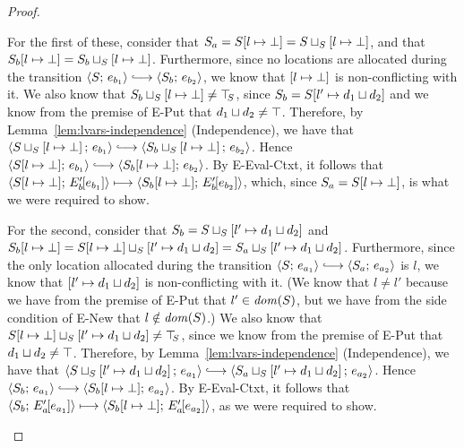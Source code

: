 \begin{proof}
\begin{enumerate}
\begin{enumerate}
      For the first of these, consider that $S_a =
      S[l \mapsto \bot] =
      S \sqcup_{S} \left[ l \mapsto \bot \right]$, and that
      $S_b[l \mapsto \bot] =
      S_b \sqcup_{S} \left[ l \mapsto \bot \right]$.
      Furthermore, since no locations are allocated during the
      transition $\config{S}{e_{b_1}} \parstepsto
      \config{S_b}{e_{b_2}}$, we know that
      $\left[ l \mapsto \bot \right]$ is non-conflicting with it.
      We also know that
      $S_b \sqcup_{S} \left[ l \mapsto \bot \right] \neq \top\hspace{-0.85mm}_{S}$,
      since $S_b = S[l' \mapsto d_1 \sqcup d_2]$ and we know
      from the premise of {\sc E-Put} that $d_1 \sqcup d_2 \neq
      \top$.  Therefore, by Lemma~\ref{lem:lvars-independence}
      (Independence), we have that
      $\config{\lubstore{S}{\store{\storebindingRaw{l}{\bot}}}}{e_{b_1}}
      \parstepsto
      \config{\lubstore{S_b}{\store{\storebindingRaw{l}{\bot}}}}{e_{b_2}}$.
      Hence $\config{\extSRaw{S}{l}{\bot}}{e_{b_1}} \parstepsto
      \config{\extSRaw{S_b}{l}{\bot}}{e_{b_2}}$.  By {\sc
        E-Eval-Ctxt}, it follows that
      $\langle S[l \mapsto \bot];\, E'_b\hspace{-1mm}\left[e_{b_1}\right] \rangle
      \longmapsto
      \langle S_b[l \mapsto \bot];\, E'_b\hspace{-1mm}\left[e_{b_2}\right] \rangle$,
      which, since $S_a = S[l \mapsto \bot]$, is what we were
      required to show.

      For the second, consider that $S_b =
      S \sqcup_{S} \left[ l' \mapsto d_1 \sqcup d_2 \right]$
      and $S_b[l \mapsto \bot] =
      S[l \mapsto \bot] \sqcup_{S} \left[ l' \mapsto d_1 \sqcup d_2 \right]
      =
      S_a \sqcup_{S} \left[ l' \mapsto d_1 \sqcup d_2 \right]$.
      Furthermore, since the only location allocated during the
      transition $\config{S}{e_{a_1}} \parstepsto
      \config{S_a}{e_{a_2}}$ is $l$, we know that
      $\left[ l' \mapsto d_1 \sqcup d_2 \right]$ is
      non-conflicting with it.  (We know that $l \neq l'$ because we
      have from the premise of {\sc E-Put} that $l' \in \mathit{dom}(S)$, but
      we have from the side condition of {\sc E-New} that $l \notin
      \mathit{dom}(S)$.)  We also know that
      $S[l \mapsto \bot] \sqcup_{S} \left[ l' \mapsto d_1 \sqcup d_2 \right]
      \neq \top\hspace{-0.85mm}_{S}$, since we know from the premise of {\sc E-Put} that
      $d_1 \sqcup d_2 \neq \top$.  Therefore, by
      Lemma~\ref{lem:lvars-independence} (Independence), we have that
      $\config{\lubstore{S}{\store{\storebindingRaw{l'}{\userlub{d_1}{d_2}}}}}{e_{a_1}}
      \parstepsto
      \config{\lubstore{S_a}{\store{\storebindingRaw{l'}{\userlub{d_1}{d_2}}}}}{e_{a_2}}$.
      Hence $\config{S_b}{e_{a_1}} \parstepsto
      \config{\extSRaw{S_b}{l}{\bot}}{e_{a_2}}$.  By {\sc
        E-Eval-Ctxt}, it follows that
      $\langle S_b;\, E'_a\hspace{-1mm}\left[e_{a_1}\right] \rangle \longmapsto
      \langle S_b[l \mapsto \bot];\, E'_a\hspace{-1mm}\left[e_{a_2}\right] \rangle$, as
      we were required to show.


\end{enumerate}
\end{enumerate}
\end{proof}
